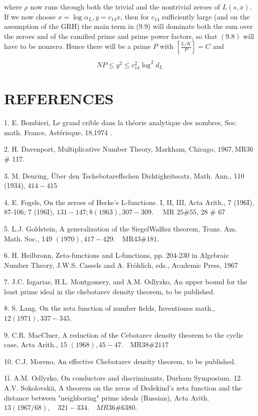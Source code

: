 where $\rho$ now runs through both the trivial and the nontrivial zeroes of $L(s, x)$. If we now choose $x=\log \alpha_{L}, y=c_{14} x$, then for $c_{14}$ sufficiently large (and on the assumption of the GRH) the main term in (9.9) will dominate both the sum over the zeroes and of the ramified prime and prime power factors, so that $(9.8)$ will have to be nonzero. Hence there will be a prime $P$ with $\left[\frac{L / K}{P}\right]=C$ and

$$
N P \leqslant y^{2} \leqslant c_{14}^{2} \log ^{2} d_{L}
$$



\section{REFERENCES}

1. E. Bombieri, Le grand crible dans la théorie analytique des nombres, Soc. math. France, Astérisque, 18,1974 .

2. H. Davenport, Multiplicative Number Theory, Markham, Chicago, $1967, \mathrm{MR} 36$ # 117.

3. M. Deuring, Über den Tschebotareffschen Dichtigkeitssatz, Math. Ann., 110 (1934), $414-415$

4. E. Fogels, On the zeroes of Hecke's L-functions. I, II, III, Acta Arith., 7 (196I), 87-106; 7 (196I), $131-147 ; 8(1963), 307-309 . \quad$ MR $25 \# 55$, 28 # 67

5. L.J. Goldstein, A generalization of the SiegelWalfisz theorem, Trans. Am. Math. Soc., 149 $(1970), 417-429 . \quad \mathrm{MR} 43 \# 181$.

6. H. Heilbronn, Zeta-functions and L-functions, pp. 204-230 in Algebraic Number Theory, J.W.S. Cassels and A. Fröhlich, eds., Academic Press, 1967

7. J.C. Iagarias, H.L. Montgomery, and A.M. Odlyzko, An upper bound for the least prime ideal in the chebotarev density theorem, to be published.

8. S. Lang. On the zeta function of number fields, Inventiones math., $12(1971), 337-345$.

9. C.R. MacCluer, A reduction of the Cebotarev density theorem to the cyclic case, Acta Arith., 15 $(1968), 45-47 . \quad \mathrm{MR} 38 \# 2117$

10. C.J. Moreno, An effective Chebotarev density theorem, to be published.

1l. A.M. Odlyzko, On conductors and discriminants, Durham Symposium. 12. A.V. Sokolovskii, A theorem on the zeros of Dedekind's zeta function and the distance between "neighboring" prime ideals (Russian), Acta Arith. $13(1967 / 68), \quad 321-334 . \quad M R 36 \# 6380$.

